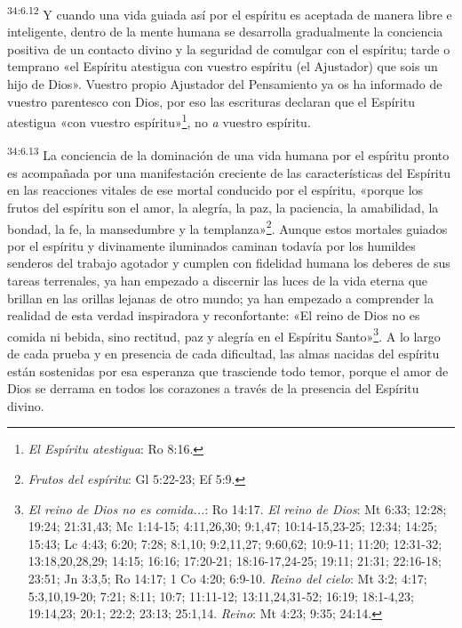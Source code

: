 \par
\textsuperscript{34:6.12} Y cuando una vida guiada así por el espíritu es aceptada de manera libre e inteligente, dentro de la mente humana se desarrolla gradualmente la conciencia positiva de un contacto divino y la seguridad de comulgar con el espíritu; tarde o temprano «el Espíritu atestigua con vuestro espíritu (el Ajustador) que sois un hijo de Dios». Vuestro propio Ajustador del Pensamiento ya os ha informado de vuestro parentesco con Dios, por eso las escrituras declaran que el Espíritu atestigua «con vuestro espíritu»\footnote{\textit{El Espíritu atestigua}: Ro 8:16.}, no \textit{a} vuestro espíritu.

\par
\textsuperscript{34:6.13} La conciencia de la dominación de una vida humana por el espíritu pronto es acompañada por una manifestación creciente de las características del Espíritu en las reacciones vitales de ese mortal conducido por el espíritu, «porque los frutos del espíritu son el amor, la alegría, la paz, la paciencia, la amabilidad, la bondad, la fe, la mansedumbre y la templanza»\footnote{\textit{Frutos del espíritu}: Gl 5:22-23; Ef 5:9.}. Aunque estos mortales guiados por el espíritu y divinamente iluminados caminan todavía por los humildes senderos del trabajo agotador y cumplen con fidelidad humana los deberes de sus tareas terrenales, ya han empezado a discernir las luces de la vida eterna que brillan en las orillas lejanas de otro mundo; ya han empezado a comprender la realidad de esta verdad inspiradora y reconfortante: «El reino de Dios no es comida ni bebida, sino rectitud, paz y alegría en el Espíritu Santo»\footnote{\textit{El reino de Dios no es comida...}: Ro 14:17. \textit{El reino de Dios}: Mt 6:33; 12:28; 19:24; 21:31,43; Mc 1:14-15; 4:11,26,30; 9:1,47; 10:14-15,23-25; 12:34; 14:25; 15:43; Lc 4:43; 6:20; 7:28; 8:1,10; 9:2,11,27; 9:60,62; 10:9-11; 11:20; 12:31-32; 13:18,20,28,29; 14:15; 16:16; 17:20-21; 18:16-17,24-25; 19:11; 21:31; 22:16-18; 23:51; Jn 3:3,5; Ro 14:17; 1 Co 4:20; 6:9-10. \textit{Reino del cielo}: Mt 3:2; 4:17; 5:3,10,19-20; 7:21; 8:11; 10:7; 11:11-12; 13:11,24,31-52; 16:19; 18:1-4,23; 19:14,23; 20:1; 22:2; 23:13; 25:1,14. \textit{Reino}: Mt 4:23; 9:35; 24:14.}. A lo largo de cada prueba y en presencia de cada dificultad, las almas nacidas del espíritu están sostenidas por esa esperanza que trasciende todo temor, porque el amor de Dios se derrama en todos los corazones a través de la presencia del Espíritu divino.

